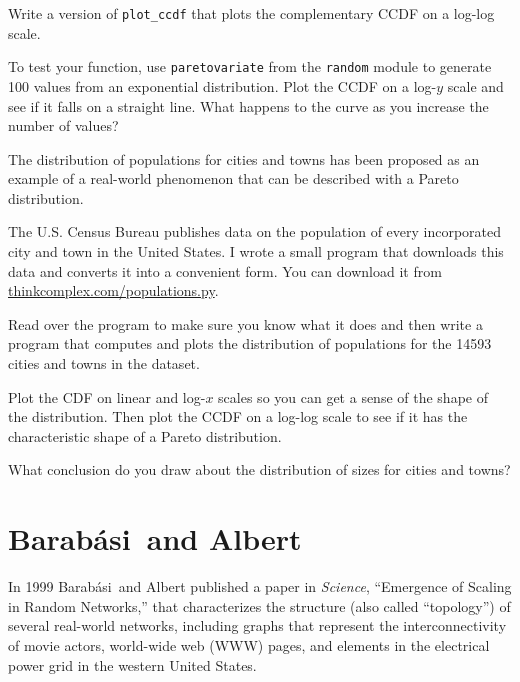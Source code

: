 \documentclass[10pt]{book}
\begin{document}
\begin{ex}

Write a version of \verb"plot_ccdf" that plots the complementary
CCDF on a log-log scale.

To test your function, use {\tt paretovariate} from the {\tt random}
module to generate 100 values from an exponential distribution.  Plot
the CCDF on a log-$y$ scale and see if it falls on a straight line.
What happens to the curve as you increase the number of values?

\end{ex}


\begin{ex}

The distribution of populations for cities and towns has been proposed
as an example of a real-world phenomenon that can be described
with a Pareto distribution.

The U.S. Census Bureau publishes data on the population of every
incorporated city and town in the United States.  I wrote a
small program that downloads this data and converts it into a
convenient form.  You can download it from
\url{thinkcomplex.com/populations.py}.  

Read over the program to make sure you know what it does and then
write a program that computes and plots the distribution of
populations for the 14593 cities and towns in the dataset.

Plot the CDF on linear and log-$x$ scales so you can get a sense of
the shape of the distribution.  Then plot the CCDF on a log-log scale
to see if it has the characteristic shape of a Pareto distribution.

What conclusion do you draw about the distribution of sizes
for cities and towns?

\end{ex}

\newcommand{\Barabasi}{Barab\'{a}si}

\section{\Barabasi~and Albert}

In 1999 \Barabasi~and Albert published a paper in {\em Science},
``Emergence of Scaling in Random Networks,''
that characterizes the structure (also called ``topology'') of
several real-world networks, including graphs that represent
the interconnectivity of movie actors, world-wide web (WWW) pages,
and elements in the electrical power grid in the western
United States.  
\end{document}
